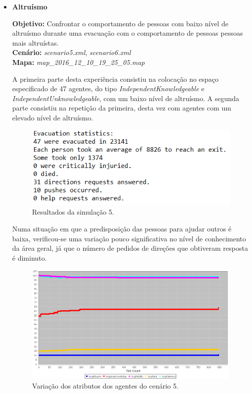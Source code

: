 \documentclass[12pt]{article}
\begin{document}
\begin{titlepage}
\begin{itemize}
\item \textbf{Altruísmo}

\textbf{Objetivo:} 
Confrontar o comportamento de pessoas com baixo nível de altruísmo durante uma evacuação com o comportamento de pessoas pessoas mais altruístas.
\\\textbf{Cenário:} 
\textit{scenario5.xml}, \textit{scenario6.xml}
\\\textbf{Mapa:} 
\textit{map\_2016\_12\_10\_19\_25\_05.map}
\newline


A primeira parte desta experiência consistiu na colocação no espaço especificado de 47 agentes, do tipo \textit{IndependentKnowledgeable} e \textit{IndependentUnknowledgeable}, com um baixo nível de altruísmo. A segunda parte consistiu na repetição da primeira, desta vez com agentes com um elevado nível de altruísmo.

\begin{figure}[H]
	\centering
	\includegraphics{log_sc_alt1.png}
	\caption{Resultados da simulação 5.}
	\label{log_sc1}
\end{figure}

Numa situação em que a predisposição das pessoas para ajudar outros é baixa, verificou-se uma variação pouco significativa no nível de conhecimento da área geral, já que o número de pedidos de direções que obtiveram resposta é diminuto.

\begin{figure}[H]
	\centering
	\includegraphics{graph_sc_alt1.png}
	\caption{Variação dos atributos dos agentes do cenário 5.}
	\label{graph_sc1}
\end{figure}


\end{itemize}
\end{titlepage}
\end{document}

